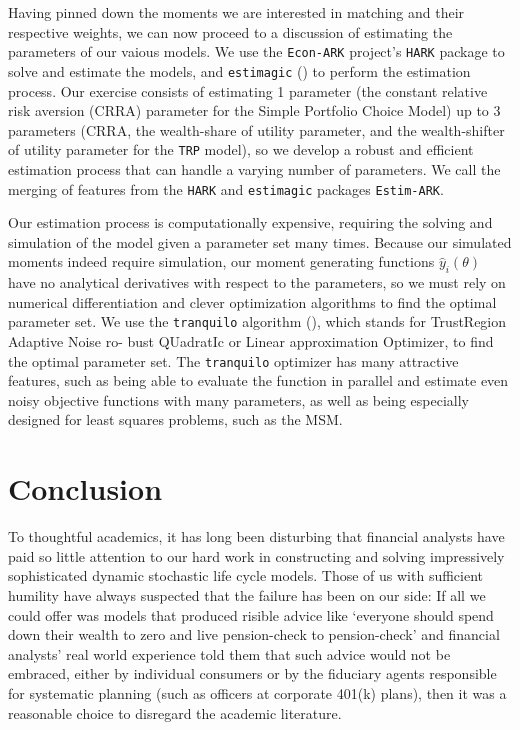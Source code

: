 \documentclass{article}
\begin{document}
Having pinned down the moments we are interested in matching and their respective weights, we can now proceed to a discussion of estimating the parameters of our vaious models. We use the \texttt{Econ-ARK} project's \texttt{HARK} package to solve and estimate the models, and \texttt{estimagic} (\cite{Gabler2022}) to perform the estimation process. Our exercise consists of estimating 1 parameter (the constant relative risk aversion (CRRA) parameter for the Simple Portfolio Choice Model) up to 3 parameters (CRRA, the wealth-share of utility parameter, and the wealth-shifter of utility parameter for the \texttt{TRP} model), so we develop a robust and efficient estimation process that can handle a varying number of parameters. We call the merging of features from the \texttt{HARK} and \texttt{estimagic} packages \texttt{Estim-ARK}.

Our estimation process is computationally expensive, requiring the solving and simulation of the model given a parameter set many times. Because our simulated moments indeed require simulation, our moment generating functions $\hat{y}_i(\theta)$ have no analytical derivatives with respect to the parameters, so we must rely on numerical differentiation and clever optimization algorithms to find the optimal parameter set. We use the \texttt{tranquilo} algorithm (\cite{Gabler2024}), which stands for TrustRegion Adaptive Noise ro- bust QUadratIc or Linear approximation Optimizer, to find the optimal parameter set. The \texttt{tranquilo} optimizer has many attractive features, such as being able to evaluate the function in parallel and estimate even noisy objective functions with many parameters, as well as being especially designed for least squares problems, such as the MSM.

\section{Conclusion}

To thoughtful academics, it has long been disturbing that financial analysts have paid so little attention to our hard work in constructing and solving impressively sophisticated dynamic stochastic life cycle models. Those of us with sufficient humility have always suspected that the failure has been on our side: If all we could offer was models that produced risible advice like `everyone should spend down their wealth to zero and live pension-check to pension-check' and financial analysts' real world experience told them that such advice would not be embraced, either by individual consumers or by the fiduciary agents responsible for systematic planning (such as officers at corporate 401(k) plans), then it was a reasonable choice to disregard the academic literature.
\end{document}
